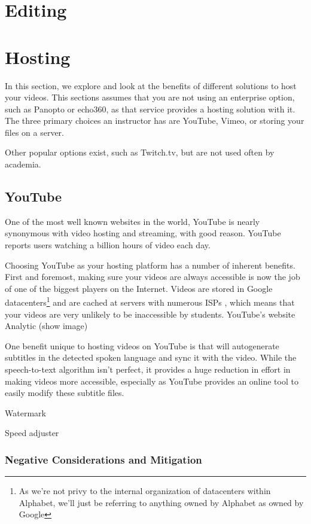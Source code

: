 \documentclass[sigconf]{acmart}
\begin{document}
\section{Editing}
\label{edit}

\section{Hosting}
\label{hosting}

In this section, we explore and look at the benefits of different solutions to host your videos.  
This sections assumes that you are not using an enterprise option, such as Panopto or echo360, as that service provides a hosting solution with it.
The three primary choices an instructor has are YouTube, Vimeo, or storing your files on a server.

Other popular options exist, such as Twitch.tv, but are not used often by academia.

\subsection{YouTube}
One of the most well known websites in the world, YouTube is nearly synonymous with video hosting and streaming, with good reason.
YouTube reports users watching a billion hours of video each day.\cite{ytstats}


Choosing YouTube as your hosting platform has a number of inherent benefits.
First and foremost, making sure your videos are always accessible is now the job of one of the biggest players on the Internet.
Videos are stored in Google datacenters\footnote{As we're not privy to the internal organization of datacenters within Alphabet, we'll just be referring to anything owned by Alphabet as owned by Google} and are cached at servers with numerous ISPs \cite{peering}, which means that your videos are very unlikely to be inaccessible by students. 
YouTube's website
Analytic  (show image)


One benefit unique to hosting videos on YouTube is that will autogenerate subtitles in the detected spoken language \cite{liao2013large} and sync it with the video.  While the speech-to-text algorithm isn't perfect, it provides a huge reduction in effort in making videos more accessible, especially as YouTube provides an online tool to easily modify these subtitle files.


Watermark

Speed adjuster

\subsubsection{Negative Considerations and Mitigation}
\end{document}
